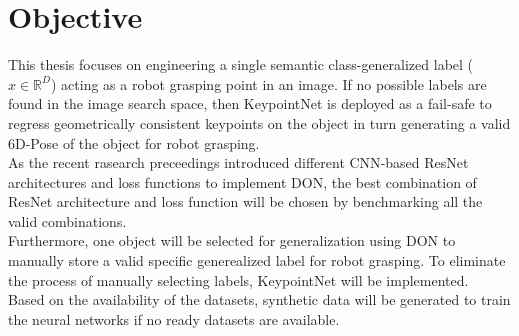 \chapter{Objective}

This thesis focuses on engineering a single semantic class-generalized label ($x \in \mathbb{R}^D$) acting as a robot grasping point in an image.
If no possible labels are found in the image search space, then KeypointNet is deployed as a fail-safe to regress geometrically consistent keypoints
on the object in turn generating a valid 6D-Pose of the object for robot grasping.\\

As the recent rasearch preceedings \parencites{florence2018dense}{adrian2022efficient}{rope-manipulation}{block-manipulation}
introduced different \ac{CNN}-based \ac{ResNet}~\cite{resnet} architectures and loss functions to implement \ac{DON}, the best combination
of \ac{ResNet} architecture and loss function will be chosen by benchmarking all the valid combinations.\\

Furthermore, one object will be selected for generalization using \ac{DON} to manually store a valid specific generealized label for robot
grasping. To eliminate the process of manually selecting labels, KeypointNet will be implemented.\\

Based on the availability of the datasets, synthetic data \cite{nikolenko2021synthetic} will be generated to train the neural networks if no
ready datasets are available.